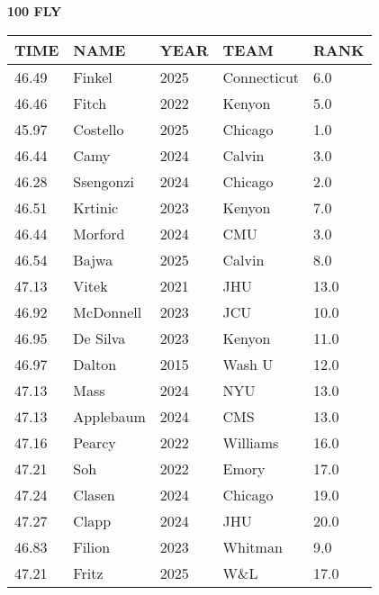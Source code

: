 \begin{minipage}[t]{0.48\textwidth}
\centering
\textbf{100 FLY}\\[0.05cm]
\begin{tabular}{@{}p{1.8cm}p{2.8cm}p{1.2cm}p{1.4cm}p{0.8cm}@{}}
\hline
\textbf{TIME} & \textbf{NAME} & \textbf{YEAR} & \textbf{TEAM} & \textbf{RANK} \\
\hline
46.49 & Finkel & 2025 & Connecticut & 6.0 \\
46.46 & Fitch & 2022 & Kenyon & 5.0 \\
45.97 & Costello & 2025 & Chicago & 1.0 \\
46.44 & Camy & 2024 & Calvin & 3.0 \\
46.28 & Ssengonzi & 2024 & Chicago & 2.0 \\
46.51 & Krtinic & 2023 & Kenyon & 7.0 \\
46.44 & Morford & 2024 & CMU & 3.0 \\
46.54 & Bajwa & 2025 & Calvin & 8.0 \\
47.13 & Vitek & 2021 & JHU & 13.0 \\
46.92 & McDonnell & 2023 & JCU & 10.0 \\
46.95 & De Silva & 2023 & Kenyon & 11.0 \\
46.97 & Dalton & 2015 & Wash U & 12.0 \\
47.13 & Mass & 2024 & NYU & 13.0 \\
47.13 & Applebaum & 2024 & CMS & 13.0 \\
47.16 & Pearcy & 2022 & Williams & 16.0 \\
47.21 & Soh & 2022 & Emory & 17.0 \\
47.24 & Clasen & 2024 & Chicago & 19.0 \\
47.27 & Clapp & 2024 & JHU & 20.0 \\
46.83 & Filion & 2023 & Whitman & 9.0 \\
47.21 & Fritz & 2025 & W\&L & 17.0 \\
\hline
\end{tabular}
\end{minipage}\hfill

